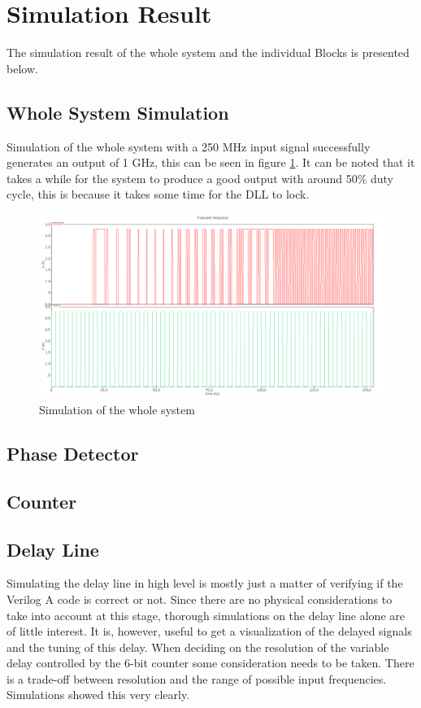 \documentclass[a4paper,12pt]{article} \usepackage{graphicx}
\begin{document}
\section{Simulation Result}
The simulation result of the whole system and the individual Blocks is
presented below.
\subsection{Whole System Simulation}
Simulation of the whole system with a 250 MHz input signal successfully
generates an output of 1 GHz, this can be seen in figure \ref{fig:high_sim}.
It can be noted that it takes a while for the system to produce a good output
with around 50\% duty cycle, this is because it takes some time for the DLL
to lock.
\begin{figure}[hb]
        \centering
        \includegraphics[width=\textwidth]{../Bilder/high_level_sim.png}
        \caption{Simulation of the whole system}
        \label{fig:high_sim}
\end{figure}

\subsection{Phase Detector}
\subsection{Counter}
\subsection{Delay Line}
Simulating the delay line in high level is mostly just a matter of
verifying if the Verilog A code is correct or not. Since there are no physical
considerations to take into account at this stage, thorough simulations
on the delay line alone are of little interest. It is, however, useful
to get a visualization of the delayed signals and the tuning of this
delay. When deciding on the resolution of the variable delay
controlled by the 6-bit counter some consideration needs to be taken. 
There is a trade-off between resolution and the
range of possible input frequencies. Simulations showed this very
clearly. 
\end{document}
